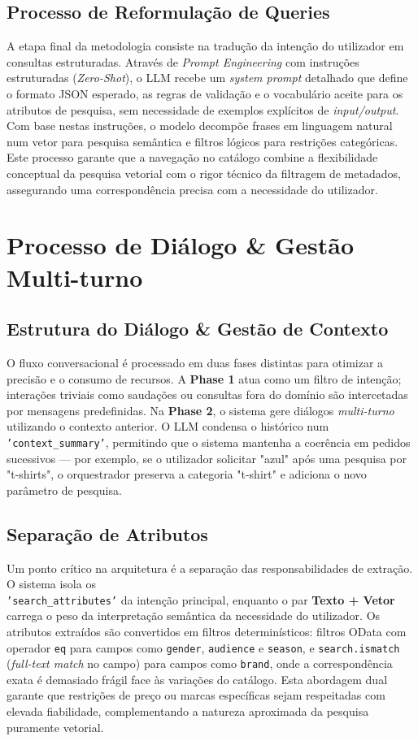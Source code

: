 \documentclass[runningheads]{llncs}
\begin{document}
\subsection*{Processo de Reformulação de Queries}
A etapa final da metodologia consiste na tradução da intenção do utilizador em consultas estruturadas. Através de \textit{Prompt Engineering} com instruções estruturadas (\textit{Zero-Shot}), o LLM recebe um \textit{system prompt} detalhado que define o formato JSON esperado, as regras de validação e o vocabulário aceite para os atributos de pesquisa, sem necessidade de exemplos explícitos de \textit{input/output}. Com base nestas instruções, o modelo decompõe frases em linguagem natural num vetor para pesquisa semântica e filtros lógicos para restrições categóricas. Este processo garante que a navegação no catálogo combine a flexibilidade conceptual da pesquisa vetorial com o rigor técnico da filtragem de metadados, assegurando uma correspondência precisa com a necessidade do utilizador.

\section*{Processo de Diálogo \& Gestão Multi-turno}
\subsection*{Estrutura do Diálogo \& Gestão de Contexto}
O fluxo conversacional é processado em duas fases distintas para otimizar a precisão e o consumo de recursos. A \textbf{Phase 1} atua como um filtro de intenção; interações triviais como saudações ou consultas fora do domínio são intercetadas por mensagens predefinidas. Na \textbf{Phase 2}, o sistema gere diálogos \textit{multi-turno} utilizando o contexto anterior. O LLM condensa o histórico num \texttt{'context\_summary'}, permitindo que o sistema mantenha a coerência em pedidos sucessivos — por exemplo, se o utilizador solicitar "azul" após uma pesquisa por "t-shirts", o orquestrador preserva a categoria "t-shirt" e adiciona o novo parâmetro de pesquisa.

\subsection*{Separação de Atributos}
Um ponto crítico na arquitetura é a separação das responsabilidades de extração. O sistema isola os \\ \texttt{'search\_attributes'} da intenção principal, enquanto o par \textbf{Texto + Vetor} carrega o peso da interpretação semântica da necessidade do utilizador. Os atributos extraídos são convertidos em filtros determinísticos: filtros OData com operador \texttt{eq} para campos como \texttt{gender}, \texttt{audience} e \texttt{season}, e \texttt{search.ismatch} (\textit{full-text match} no campo) para campos como \texttt{brand}, onde a correspondência exata é demasiado frágil face às variações do catálogo. Esta abordagem dual garante que restrições de preço ou marcas específicas sejam respeitadas com elevada fiabilidade, complementando a natureza aproximada da pesquisa puramente vetorial.
\end{document}
